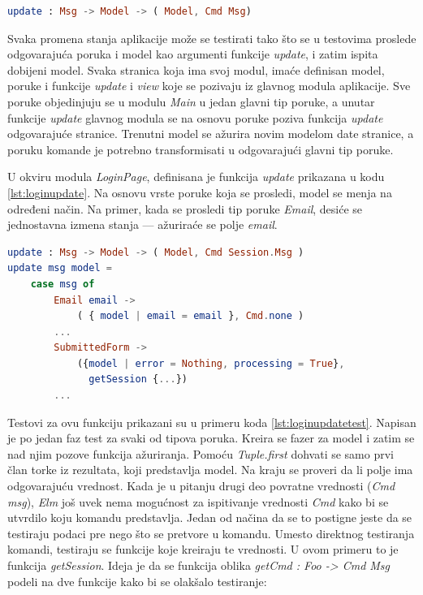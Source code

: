 \documentclass[12pt,oneside]{memoir}
\begin{document}
\begin{minipage}{\linewidth}
\begin{lstlisting}[language=elm, basicstyle=\small, caption={Anotacija funkcije \emph{update}},captionpos=b, label={lst:updateanotacija}]
		       update : Msg -> Model -> ( Model, Cmd Msg)
\end{lstlisting}
\end{minipage}

\par Svaka promena stanja aplikacije može se testirati tako što se u testovima proslede odgovarajuća poruka i model kao argumenti funkcije \emph{update}, i zatim ispita dobijeni model. Svaka stranica koja ima svoj modul, imaće definisan model, poruke i funkcije \emph{update} i \emph{view} koje se pozivaju iz glavnog modula aplikacije. Sve poruke objedinjuju se u modulu \emph{Main} u jedan glavni tip poruke, a unutar funkcije \emph{update} glavnog modula se na osnovu poruke poziva funkcija \emph{update} odgovarajuće stranice. Trenutni model se ažurira novim modelom date stranice, a poruku komande je potrebno transformisati u odgovarajući glavni tip poruke.
\par U okviru modula \emph{LoginPage}, definisana je funkcija \emph{update} prikazana u kodu \ref{lst:loginupdate}. Na osnovu vrste poruke koja se prosledi, model se menja na određeni način. Na primer, kada se prosledi tip poruke \emph{Email}, desiće se jednostavna izmena stanja --- ažuriraće se polje \emph{email}.

\begin{minipage}{\linewidth}
\begin{lstlisting}[language=elm, basicstyle=\small, caption={Funkcija \emph{update} stranice za prijavljivanje korisnika \emph{LoginPage}},captionpos=b, label={lst:loginupdate}]
update : Msg -> Model -> ( Model, Cmd Session.Msg )
update msg model =
    case msg of
        Email email ->
            ( { model | email = email }, Cmd.none )
        ... 
        SubmittedForm ->
            ({model | error = Nothing, processing = True}, 
              getSession {...})
        ...
\end{lstlisting}
\end{minipage}

\par Testovi za ovu funkciju prikazani su u primeru koda \ref{lst:loginupdatetest}. Napisan je po jedan faz test za svaki od tipova poruka. Kreira se fazer za model i zatim se nad njim pozove funkcija ažuriranja. Pomoću \emph{Tuple.first} dohvati se samo prvi član torke iz rezultata, koji predstavlja model. Na kraju se proveri da li polje ima odgovarajuću vrednost. Kada je u pitanju drugi deo povratne vrednosti (\emph{Cmd msg}), \emph{Elm} još uvek nema mogućnost za ispitivanje vrednosti \emph{Cmd} kako bi se utvrdilo koju komandu predstavlja. Jedan od načina da se to postigne jeste da se testiraju podaci pre nego što se pretvore u komandu. Umesto direktnog testiranja komandi, testiraju se funkcije koje kreiraju te vrednosti. U ovom primeru to je funkcija \emph{getSession}. Ideja je da se funkcija oblika \emph{getCmd : Foo -> Cmd Msg} podeli na dve funkcije kako bi se olakšalo testiranje: 
\end{document}
